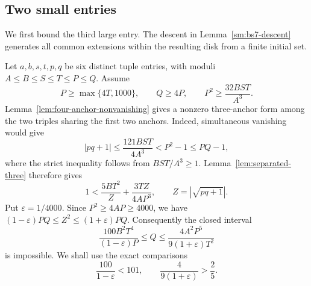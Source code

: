 \documentclass[12pt]{article}
\numberwithin{equation}{section}
\begin{document}
\subsection{Two small entries}

We first bound the third large entry. The descent in Lemma~\ref{sm:bs7-descent} generates all common extensions within the resulting disk from a finite initial set.

Let $a,b,s,t,p,q$ be six distinct tuple entries, with moduli
$A\le B\le S\le T\le P\le Q$. Assume
\begin{equation*}
 P\ge\max\{4T,1000\},\qquad Q\ge4P,
 \qquad P^2\ge\frac{32BST}{A^3}.
\end{equation*}
Lemma~\ref{lem:four-anchor-nonvanishing} gives a nonzero three-anchor form among the two triples sharing the first two anchors. Indeed, simultaneous vanishing would give
\begin{equation*}
 |pq+1|\le\frac{121BST}{4A^3}
 <P^2-1\le PQ-1,
\end{equation*}
where the strict inequality follows from $BST/A^3\ge1$.
Lemma~\ref{lem:separated-three} therefore gives
\begin{equation*}
 1<\frac{5BT^2}{Z}+\frac{3TZ}{4AP^3},
 \qquad Z=|\sqrt{pq+1}|.
\end{equation*}
Put $\varepsilon=1/4000$. Since $P^2\ge4AP\ge4000$, we have
$(1-\varepsilon)PQ\le Z^2\le(1+\varepsilon)PQ$.
Consequently the closed interval
\begin{equation}\label{sm:six-V-interval}
 \frac{100B^2T^4}{(1-\varepsilon)P}\le Q
 \le\frac{4A^2P^5}{9(1+\varepsilon)T^2}
\end{equation}
is impossible. We shall use the exact comparisons
\begin{equation*}
 \frac{100}{1-\varepsilon}<101,
 \qquad \frac4{9(1+\varepsilon)}>\frac25.
\end{equation*}
\end{document}
